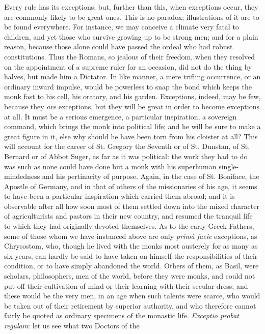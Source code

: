 Every rule has its exceptions; but, further than this, when
exceptions occur, they are commonly likely to be great ones. This is
no paradox; illustrations of it are to be found everywhere. For
instance, we may conceive a climate very fatal to children, and yet
those who survive growing up to be strong men; and for a plain reason,
because those alone could have passed the ordeal who had robust
constitutions. Thus the Romans, so jealous of their freedom, when they
resolved on the appointment of a supreme ruler for an occasion, did
not do the thing by halves, but made him a Dictator. In like manner, a
mere trifling occurrence, or an ordinary inward impulse, would be
powerless to snap the bond which keeps the monk fast to his cell, his
oratory, and his garden. Exceptions, indeed, may be few, because they \emph{are}
exceptions, but they will be great in order to become exceptions at
all. It must be a serious emergence, a particular inspiration, a
sovereign command, which brings the monk into political life; and he
will be sure to make a great figure in it, else why should he have
been torn from his cloister at all? This will account for the career
of St. Gregory the Seventh or of St. Dunstan, of St. Bernard or of
Abbot Suger, as far as it was political: the work they had to do was
such as none could have done but a monk with his superhuman
single-mindedness and his pertinacity of purpose. Again, in the
case of St. Boniface, the Apostle of Germany, and in that of others of
the missionaries of his age, it seems to have been a particular
inspiration which carried them abroad; and it is observable after all
how soon most of them settled down into the mixed character of
agriculturists and pastors in their new country, and resumed the
tranquil life to which they had originally devoted themselves. As to
the early Greek Fathers, some of those whom we have instanced above
are only \emph{primâ facie} exceptions, as Chrysostom, who, though he
lived with the monks most austerely for as many as six years, can
hardly be said to have taken on himself the responsibilities of their
condition, or to have simply abandoned the world. Others of them, as
Basil, were scholars, philosophers, men of the world, before they were
monks, and could not put off their cultivation of mind or their
learning with their secular dress; and these would be the very men, in
an age when such talents were scarce, who would be taken out of their
retirement by superior authority, and who therefore cannot fairly be
quoted as ordinary specimens of the monastic life.
\emph{Exceptio probat regulam}: let us see what two Doctors of the
